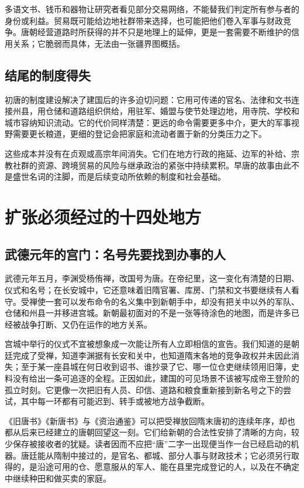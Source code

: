 多语文书、钱币和器物让研究者看见部分交易网络，不能替我们判定所有参与者的身份或利益。贸易既可能给边地社群带来选择，也可能把他们卷入军事与财政竞争。唐朝经营道路时所获得的并不只是地理上的延伸，更是一套需要不断维护的信用关系；它脆弱而具体，无法由一张疆界图概括。

\subsection{结尾的制度得失}
初唐的制度建设解决了建国后的许多迫切问题：它用可传递的官名、法律和文书连接州县，用仓储和道路组织供给，用驻军、婚盟与使节处理边地，用寺院、学校和城市容纳知识流动。它的代价同样清楚：更远的命令需要更多中介，更大的军事视野需要更长粮道，更细的登记会把家庭和流动者置于新的分类压力之下。

这些成本并没有在贞观或高宗年间消失。它们在地方行政的拖延、边军的补给、宗教社群的资源、跨境贸易的风险与继承政治的紧张中持续累积。早唐的故事由此不是盛世名词的注脚，而是后续变动所依赖的制度和社会基础。

\section{扩张必须经过的十四处地方}
\label{sec:early-tang-eight-places}

\subsection{武德元年的宫门：名号先要找到办事的人}
武德元年五月，李渊受杨侑禅，改国号为唐。在帝纪里，这一变化有清楚的日期、仪式和名号；在长安城中，它还意味着旧隋官署、库房、门禁和文书要继续有人看守。受禅使一套可以发布命令的名义集中到新朝手中，却没有把关中以外的军队、仓储和州县一并移进宫城。新朝最初面对的不是一张等待涂色的地图，而是许多已经被战争打断、又仍在运作的地方关系。

宫城中举行的仪式不宜被想象成一次能让所有人立即相信的宣告。我们知道的是朝廷完成了受禅，知道李渊据有长安和关中，也知道隋末各地的竞争政权并未因此消失；至于某一座县城在何日收到诏书、谁抄录了它、哪一位仓吏继续领用旧簿，史料没有给出一条可追逐的全程。正因如此，建国的可见场景不该被写成帝王登阶的孤立时刻。它更像一次把旧有人员、印信、道路和粮食重新接到新名号之下的尝试，其中每一环都有可能迟到、转手或被地方战争截断。

《旧唐书》《新唐书》与《资治通鉴》可以把受禅放回隋末唐初的连续年序，却也都从后来已经建立的唐朝回望这一刻。它们给新朝的合法性安排了清晰的方向，较少保存被接收者的犹疑。读者因而不应把“唐”二字一出现便当作一台已经启动的机器。唐廷能从隋制中接过的，是官名、都城、部分人事与财政技术；它必须另行取得的，是沿途可用的仓、愿意服从的军人、能在县里完成登记的人，以及在不确定中继续种田和做买卖的家庭。

